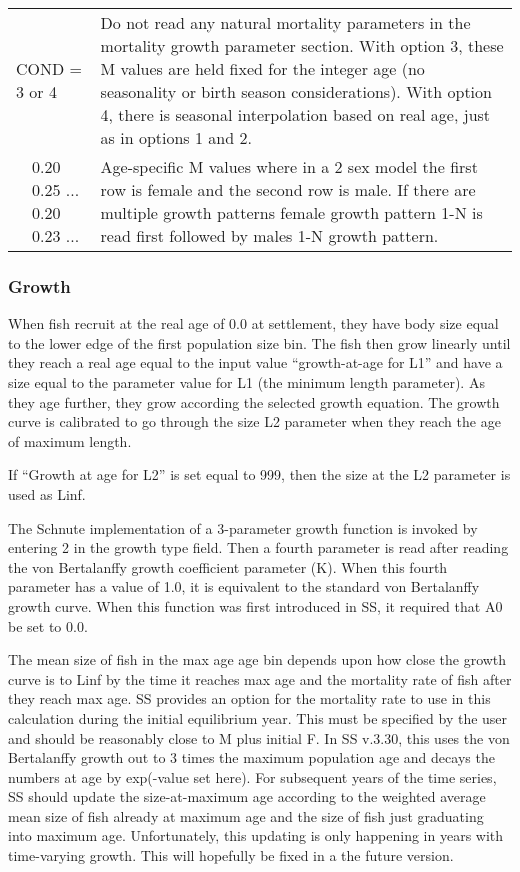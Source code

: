 \begin{longtable}{p{0.5cm} p{2cm} p{12.75cm}}
	\multicolumn{2}{l}{COND = 3 or 4} \Tstrut & Do not read any natural mortality parameters in the mortality growth parameter section.  With option 3, these M values are held fixed for the integer age (no seasonality or birth season considerations). With option 4, there is seasonal interpolation based on real age, just as in options 1 and 2.\\

	& 0.20 0.25 ... 0.20 0.23 ... & Age-specific M values where in a 2 sex model the first row is female and the second row is male. If there are multiple growth patterns female growth pattern 1-N is read first followed by males 1-N growth pattern.\Bstrut\\
	\hline
\end{longtable}

\subsubsection{Growth}

When fish recruit at the real age of 0.0 at settlement, they have body size equal to the lower edge of the first population size bin.  The fish then grow linearly until they reach a real age equal to the input value “growth-at-age for L1” and have a size equal to the parameter value for L1 (the minimum length parameter).  As they age further, they grow according the selected growth equation.  The growth curve is calibrated to go through the size L2 parameter when they reach the age of maximum length.
	
If “Growth at age for L2” is set equal to 999, then the size at the L2 parameter is used as Linf. 
	
The Schnute implementation of a 3-parameter growth function is invoked by entering 2 in the growth type field.  Then a fourth parameter is read after reading the von Bertalanffy growth coefficient parameter (K). When this fourth parameter has a value of 1.0, it is equivalent to the standard von Bertalanffy growth curve.  When this function was first introduced in SS, it required that A0 be set to 0.0.
	
The mean size of fish in the max age age bin depends upon how close the growth curve is to Linf by the time it reaches max age and the mortality rate of fish after they reach max age. SS provides an option for the mortality rate to use in this calculation during the initial equilibrium year. This must be specified by the user and should be reasonably close to M plus initial F. In SS v.3.30, this uses the von Bertalanffy growth out to 3 times the maximum population age and decays the numbers at age by exp(-value set here). For subsequent years of the time series, SS should update the size-at-maximum age according to the weighted average mean size of fish already at maximum age and the size of fish just graduating into maximum age.  Unfortunately, this updating is only happening in years with time-varying growth. This will hopefully be fixed in a the future version.
	
